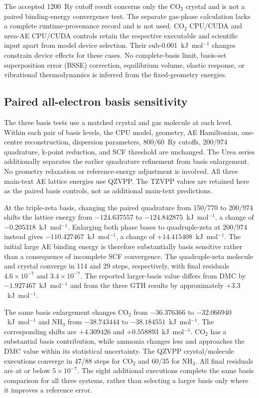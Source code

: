 The accepted 1200~Ry cutoff result concerns only the CO$_2$ crystal and is not a paired binding-energy convergence test. The separate gas-phase calculation lacks a complete runtime-provenance record and is not used. CO$_2$ CPU/CUDA and urea-AE CPU/CUDA controls retain the respective executable and scientific input apart from model device selection. Their sub-0.001~kJ~mol$^{-1}$ changes constrain device effects for these cases. No complete-basis limit, basis-set superposition error (BSSE) correction, equilibrium volume, elastic response, or vibrational thermodynamics is inferred from the fixed-geometry energies.

\subsection{Paired all-electron basis sensitivity}
\label{sec:urea-basis}
\label{sec:crystal-basis}

The three basis tests use a matched crystal and gas molecule at each level. Within each pair of basis levels, the CPU model, geometry, AE Hamiltonian, one-centre reconstruction, dispersion parameters, 800/60~Ry cutoffs, 200/974 quadrature, k-point reduction, and SCF threshold are unchanged. The Urea series additionally separates the earlier quadrature refinement from basis enlargement. No geometry relaxation or reference-energy adjustment is involved. All three main-text AE lattice energies use QZVPP. The TZVPP values are retained here as the paired basis controls, not as additional main-text predictions.



At the triple-zeta basis, changing the paired quadrature from 150/770 to 200/974 shifts the lattice energy from $-124.637557$ to $-124.842875$~kJ~mol$^{-1}$, a change of $-0.205318$~kJ~mol$^{-1}$. Enlarging both phase bases to quadruple-zeta at 200/974 instead gives $-110.427467$~kJ~mol$^{-1}$, a change of $+14.415408$~kJ~mol$^{-1}$. The initial large AE binding energy is therefore substantially basis sensitive rather than a consequence of incomplete SCF convergence. The quadruple-zeta molecule and crystal converge in 114 and 29 steps, respectively, with final residuals $4.6\times10^{-7}$ and $3.4\times10^{-7}$. The reported larger-basis value differs from DMC by $-1.927467$~kJ~mol$^{-1}$ and from the three GTH results by approximately $+3.3$~kJ~mol$^{-1}$.

The same basis enlargement changes CO$_2$ from $-36.376366$ to $-32.066940$~kJ~mol$^{-1}$ and NH$_3$ from $-38.743444$ to $-38.184551$~kJ~mol$^{-1}$. The corresponding shifts are $+4.309426$ and $+0.558893$~kJ~mol$^{-1}$. CO$_2$ has a substantial basis contribution, while ammonia changes less and approaches the DMC value within its statistical uncertainty. The QZVPP crystal/molecule executions converge in 47/88 steps for CO$_2$ and 60/35 for NH$_3$. All final residuals are at or below $5\times10^{-7}$. The eight additional executions complete the same basis comparison for all three systems, rather than selecting a larger basis only where it improves a reference error.

